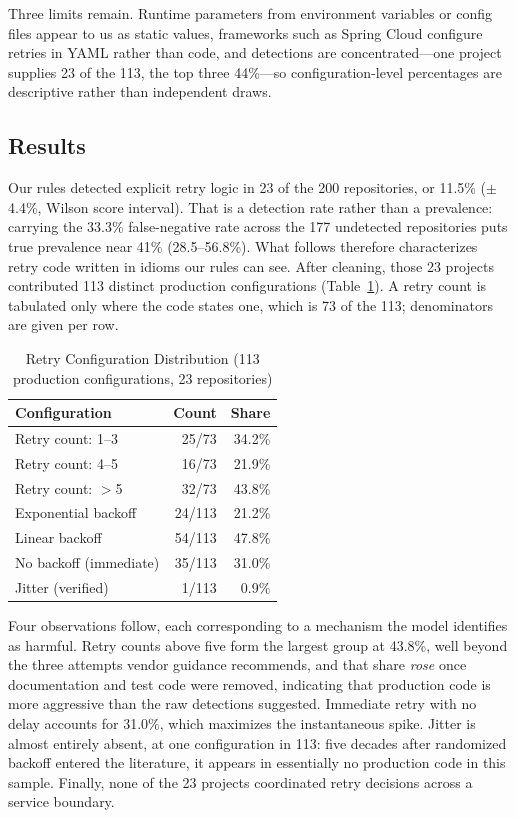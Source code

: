 \documentclass[conference]{IEEEtran}
\begin{document}
Three limits remain. Runtime parameters from environment variables or config files appear to us as static values, frameworks such as Spring Cloud configure retries in YAML rather than code, and detections are concentrated---one project supplies 23 of the 113, the top three 44\%---so configuration-level percentages are descriptive rather than independent draws.

\subsection{Results}

Our rules detected explicit retry logic in 23 of the 200 repositories, or 11.5\% ($\pm$4.4\%, Wilson score interval). That is a detection rate rather than a prevalence: carrying the 33.3\% false-negative rate across the 177 undetected repositories puts true prevalence near 41\% (28.5--56.8\%). What follows therefore characterizes retry code written in idioms our rules can see. After cleaning, those 23 projects contributed 113 distinct production configurations (Table~\ref{tab:config}). A retry count is tabulated only where the code states one, which is 73 of the 113; denominators are given per row.

\begin{table}[htbp]
\caption{Retry Configuration Distribution (113 production configurations, 23 repositories)}
\label{tab:config}
\centering
\small
\begin{tabular}{lrr}
\toprule
\textbf{Configuration} & \textbf{Count} & \textbf{Share} \\
\midrule
Retry count: 1--3 & 25/73 & 34.2\% \\
Retry count: 4--5 & 16/73 & 21.9\% \\
Retry count: $>$5 & 32/73 & 43.8\% \\
Exponential backoff & 24/113 & 21.2\% \\
Linear backoff & 54/113 & 47.8\% \\
No backoff (immediate) & 35/113 & 31.0\% \\
Jitter (verified) & 1/113 & 0.9\% \\
\bottomrule
\end{tabular}
\end{table}

Four observations follow, each corresponding to a mechanism the model identifies as harmful. Retry counts above five form the largest group at 43.8\%, well beyond the three attempts vendor guidance recommends, and that share \textit{rose} once documentation and test code were removed, indicating that production code is more aggressive than the raw detections suggested. Immediate retry with no delay accounts for 31.0\%, which maximizes the instantaneous spike. Jitter is almost entirely absent, at one configuration in 113: five decades after randomized backoff entered the literature, it appears in essentially no production code in this sample. Finally, none of the 23 projects coordinated retry decisions across a service boundary.
\end{document}
